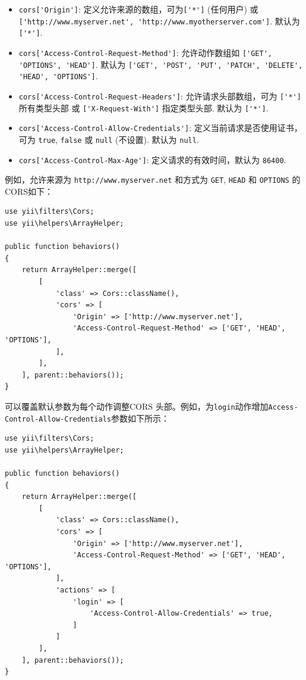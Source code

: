 \begin{itemize}
\item \lstinline|cors['Origin']|: 定义允许来源的数组，可为\lstinline|['*']| (任何用户) 或 \lstinline|['http://www.myserver.net', 'http://www.myotherserver.com']|. 默认为 \lstinline|['*']|.
\item \lstinline|cors['Access-Control-Request-Method']|: 允许动作数组如 \lstinline|['GET', 'OPTIONS', 'HEAD']|.  默认为 \lstinline|['GET', 'POST', 'PUT', 'PATCH', 'DELETE', 'HEAD', 'OPTIONS']|.
\item \lstinline|cors['Access-Control-Request-Headers']|: 允许请求头部数组，可为 \lstinline|['*']| 所有类型头部 或 \lstinline|['X-Request-With']| 指定类型头部. 默认为 \lstinline|['*']|.
\item \lstinline|cors['Access-Control-Allow-Credentials']|: 定义当前请求是否使用证书，可为 \lstinline|true|, \lstinline|false| 或 \lstinline|null| (不设置). 默认为 \lstinline|null|.
\item \lstinline|cors['Access-Control-Max-Age']|: 定义请求的有效时间，默认为 \lstinline|86400|.
\end{itemize}
例如，允许来源为 \lstinline|http://www.myserver.net| 和方式为 \lstinline|GET|, \lstinline|HEAD| 和 \lstinline|OPTIONS| 的CORS如下：

\lstset{language=php}\begin{lstlisting}
use yii\filters\Cors;
use yii\helpers\ArrayHelper;

public function behaviors()
{
    return ArrayHelper::merge([
        [
            'class' => Cors::className(),
            'cors' => [
                'Origin' => ['http://www.myserver.net'],
                'Access-Control-Request-Method' => ['GET', 'HEAD', 'OPTIONS'],
            ],
        ],
    ], parent::behaviors());
}
\end{lstlisting}
可以覆盖默认参数为每个动作调整CORS 头部。例如，为\lstinline|login|动作增加\lstinline|Access-Control-Allow-Credentials|参数如下所示：

\lstset{language=php}\begin{lstlisting}
use yii\filters\Cors;
use yii\helpers\ArrayHelper;

public function behaviors()
{
    return ArrayHelper::merge([
        [
            'class' => Cors::className(),
            'cors' => [
                'Origin' => ['http://www.myserver.net'],
                'Access-Control-Request-Method' => ['GET', 'HEAD', 'OPTIONS'],
            ],
            'actions' => [
                'login' => [
                    'Access-Control-Allow-Credentials' => true,
                ]
            ]
        ],
    ], parent::behaviors());
}
\end{lstlisting}


